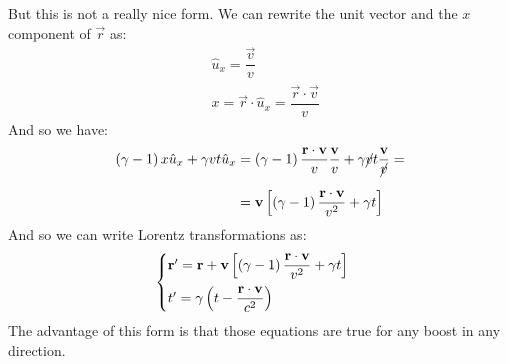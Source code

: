 But this is not a really nice form. We can rewrite the unit vector and the $x$ component of $\vec{r}$ as:
\begin{equation}
  \begin{split}
    &\hat{u}_{x} = \dfrac{\vec{v}}{v} \\[8pt]
    &x = \vec{r} \cdot \hat{u}_{x} = \dfrac{\vec{r} \cdot \vec{v}}{v}
  \end{split}
\end{equation}
And so we have:
\begin{equation}
  \begin{split}
    \left(\gamma -1\right)x\hat{u}_{x} + \gamma vt\hat{u}_{x} &= \left(\gamma -1\right)\dfrac{\vb{r} \cdot \vb{v}}{v} \dfrac{\vb{v}}{v} + \gamma \cancel{v}t \dfrac{\vb{v}}{\cancel{v}} = \\[8pt]
    & = \vb{v} \left[\left(\gamma -1\right)\dfrac{\vb{r} \cdot \vb{v}}{v^2} + \gamma t\right]
  \end{split}
\end{equation}
And so we can write Lorentz transformations as:
\begin{equation}
  \begin{cases}
    \vb{r}' = \vb{r} + \vb{v} \left[\left(\gamma - 1\right) \dfrac{\vb{r} \cdot \vb{v}}{v^2} + \gamma t\right] \\[8pt]
    t' = \gamma \left(t - \dfrac{\vb{r} \cdot \vb{v}}{c^2}\right)
  \end{cases}
\end{equation}
The advantage of this form is that those equations are true for any boost in any direction.
